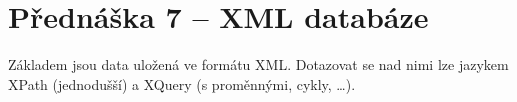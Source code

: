 \section{Přednáška 7 -- XML databáze}

Základem jsou data uložená ve formátu XML.
Dotazovat se nad nimi lze jazykem XPath (jednodušší) a XQuery (s proměnnými, cykly, \dots).
